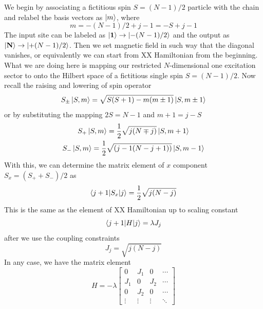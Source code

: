 \documentclass[../../../main.tex]{subfiles}
\begin{document}
We begin by associating a fictitious spin $S = (N-1)/2$ particle with the chain and relabel the basis vectors as $\ket{m}$, where
\begin{equation*}
    m = -(N-1)/2+j-1 = -S +j -1
\end{equation*}
The input site can be labeled as $\mathbf{\ket{1}}  \to \ket{-(N-1)/2}$ and the output as $\ket{\mathbf{N}} \to \ket{+(N-1)/2}$.
Then we set magnetic field in such way that the diagonal vanishes, or equivalently we can start from XX Hamiltonian from the beginning.
What we are doing here is mapping our restricted $N$-dimensional one excitation sector to onto the Hilbert space of a fictitious single spin $S = (N-1)/2$.
Now recall the raising and lowering of spin operator
\begin{equation*}
    S_{\pm}   \ket{S, m} =  \sqrt{S(S+1) - m(m \pm 1)}   \ket{S, m \pm 1}
\end{equation*}
or by substituting the mapping $2S = N-1$ and $m +1  = j-S$
\begin{gather*}
    S_{+}   \ket{S, m} =  \frac{1 }{2 }\sqrt{j(N \mp j)}   \ket{S, m +  1}\\
    S_{-}   \ket{S, m} =  \frac{1 }{2 }\sqrt{(j-1(N-j+1))}   \ket{S, m - 1}
\end{gather*}
With this, we can determine the matrix element of $x$ component $S_x = (S_++S_-)/2$ as
\begin{equation*}
    \braket{j+1 | S_x|j} = \frac{1 }{2 }\sqrt{j(N-j)}
\end{equation*}
This is the same as the element of XX Hamiltonian up to scaling constant
\begin{equation*}
    \braket{j+1 | H|j} = \lambda J_j
\end{equation*}
after we use the coupling constraints
\begin{equation*}
    J_j = \sqrt{j(N-j)}
\end{equation*}
In any case, we have the matrix element
\begin{equation*}
    H  = -\lambda\begin{bmatrix}
        0      & J_{1}  & 0      & \cdots \\
        J_1    & 0      & J_2    & \cdots \\
        0      & J_2    & 0      & \cdots \\
        \vdots & \vdots & \vdots & \ddots
    \end{bmatrix}
\end{equation*}
\end{document}
